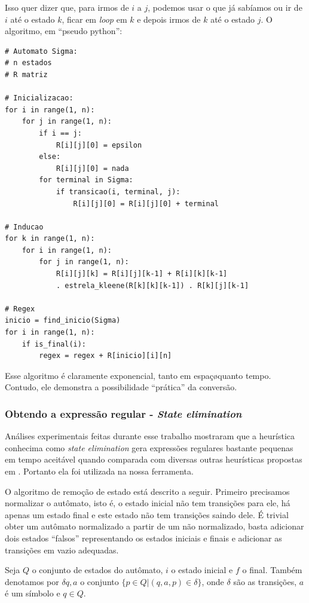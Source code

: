 \documentclass[a4 paper, 12pt]{article}
\begin{document}
Isso quer dizer que, para irmos de $i$ a $j$, podemos usar o que j\'a
sab\'iamos ou ir de $i$ at\'e o estado $k$, ficar em \emph{loop} em
$k$ e depois irmos de $k$ at\'e o estado $j$.
\newpage
O algoritmo, em ``pseudo python'':
\begin{verbatim}
# Automato Sigma:
# n estados
# R matriz

# Inicializacao:
for i in range(1, n):
    for j in range(1, n):
        if i == j:
            R[i][j][0] = epsilon
        else:
            R[i][j][0] = nada
        for terminal in Sigma:
            if transicao(i, terminal, j):
                R[i][j][0] = R[i][j][0] + terminal

# Inducao
for k in range(1, n):
    for i in range(1, n):
        for j in range(1, n):
            R[i][j][k] = R[i][j][k-1] + R[i][k][k-1]
            . estrela_kleene(R[k][k][k-1]) . R[k][j][k-1]

# Regex
inicio = find_inicio(Sigma)
for i in range(1, n):
    if is_final(i):
        regex = regex + R[inicio][i][n]
\end{verbatim}

Esse algoritmo \'e claramente exponencial, tanto em espa\c c\o quanto
tempo. Contudo, ele demonstra a possibilidade ``pr\'atica'' da
convers\~ao.

\subsubsection{Obtendo a express\~ao regular - \emph{State elimination}}
An\'alises experimentais feitas durante esse trabalho mostraram que a
heur\'istica conhecima como \emph{state elimination}\cite{sr} gera express\~oes
regulares bastante pequenas em tempo aceit\'avel quando comparada com
diversas outras heur\'isticas propostas em \cite{heu}. Portanto ela foi
utilizada na nossa ferramenta.

O algoritmo de remo\c c\~ao de estado est\'a descrito a
seguir. Primeiro precisamos normalizar o aut\^omato, isto \'e, o
estado inicial n\~ao tem transi\c c\~oes para ele, h\'a apenas um
estado final e este estado n\~ao tem transi\c c\~oes saindo
dele. \'E trivial obter um aut\^omato normalizado a partir de um n\~ao
normalizado, basta adicionar dois estados ``falsos'' representando os
estados iniciais e finais e adicionar as transi\c c\~oes em vazio
adequadas.

Seja $Q$ o conjunto de estados do aut\^omato, $i$ o estado inicial e
$f$ o final. Tamb\'em denotamos por $\delta{q,a}$ o conjunto $\{p \in
Q | (q, a, p) \in \delta\}$, onde $\delta$ s\~ao as transi\c c\~oes,
$a$ \'e um s\'imbolo e $q\in Q$.
\end{document}
